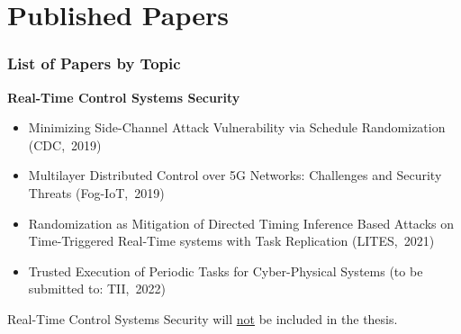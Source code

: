 
\section{Published Papers}

\begin{frame}
    \frametitle{List of Papers by Topic}
    \textbf{Real-Time Control Systems Security} 
    \begin{itemize}
        \item \textcolor<2>{black!25!white}{Minimizing Side-Channel Attack Vulnerability via Schedule Randomization (CDC,~2019)}
        \item \textcolor<2>{black!25!white}{Multilayer Distributed Control over 5G Networks: Challenges and Security Threats (Fog-IoT,~2019)}
        \item \textcolor<2>{black!25!white}{Randomization as Mitigation of Directed Timing Inference Based Attacks on Time-Triggered Real-Time systems with Task Replication (LITES,~2021)}
        \item \textcolor<2>{black!25!white}{Trusted Execution of Periodic Tasks for Cyber-Physical Systems (\alert<1>{to be submitted to}: TII,~2022)}
    \end{itemize}
    \alert<2>{Real-Time Control Systems Security will \underline{not} be included in the thesis.}
\end{frame}

